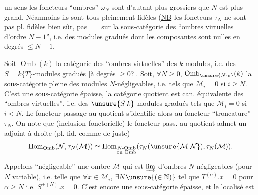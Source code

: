 un sens les foncteurs ``ombres'' $\omega_N$ sont d'autant plus grossiers que $N$ est plus grand. Néanmoins ils sont tous pleinement fidèles (\uline{NB} les foncteurs $\tau_N$ ne sont pas pl. fidèles bien sûr, pas $=$ sur la sous-catégorie des ``ombres virtuelles d'ordre $N-1$'', i.e. des modules gradués dont les composantes sont nulles en degrés $\leq N-1$.

Soit $\operatorname{Omb}(k)$ la catégorie des ``ombres virtuelles'' des $k$-modules, i.e. des $S=k\{T\}$-modules gradués [à degrés $\geq0$?]. Soit, $\forall N\geq0$, $\operatorname{Omb}_{\unsure{N\text{-n}}}(k)$ la sous-catégorie pleine des modules $N$-négligeables, i.e. tels que $\mathcal M_i=0$ si $i\geq N$.
C'est une sous-catégorie épaisse, la catégorie quotient est can. équivalente   des ``ombres virtuelles'', i.e. des $\unsure{S|k}$-modules gradués tels que $\mathcal M_i=0$ si $i<N$.
Le foncteur passage au quotient s'identifie alors au foncteur ``troncature'' $\tau_N$. On note que
(inclusion fonctorielle)  le foncteur  pass. au quotient admet un adjoint à droite (pl. fid. comme de juste)
\[
\operatorname{Hom}_{\operatorname{Omb}}(\mathcal N,\tau_N(\mathcal M))\simeq
\operatorname{Hom}_{\substack{N\text{-Omb}\\\text{ou Omb}}}(\tau_N(\unsure{\mathcal M|\mathcal N}),\tau_N(\mathcal M)).
\]

Appelons ``négligeable'' une ombre $\mathcal M$ qui est $\varinjlim$  d'ombres $N$-négligeables (pour $N$ variable), i.e. telle que  $\forall x\in\mathcal M_i$, $\exists N\unsure{(\in\mathbb N)}$ tel que $T^{(\alpha)}.x=0$ pour $\alpha\geq N$ i.e. $S^{+(N)}.x=0$. C'est encore une sous-catégorie épaisse, et le localisé est
